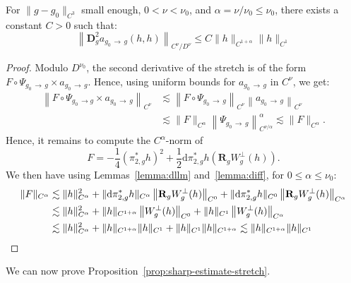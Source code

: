 \documentclass[AHL,Unicode,longabstracts,published]{cedram}
\newcommand{\RR}{\mathbf{R}}
\newcommand{\bdD}{\mathbf{D}}
\newcommand{\dd}{\mathrm{d}}
\begin{document}
\begin{lemm}\label{lemma:norme}
For $\| g-g_0\|_{C^3}$ small enough, $0<\nu < \nu_0$, and $\alpha = \nu/\nu_0 \leq \nu_0$, there exists a constant $C > 0$ such that:
\[
\left\|\bdD^2_g a_{g_0\,\to\,g} (h,h)\right\|_{C^{\nu}/D^\nu} \leq C \|h\|_{C^{1+\alpha}}\|h\|_{C^1}
\]
\end{lemm}


\begin{proof}
Modulo $D^{\nu_0}$, the second derivative of the stretch is of the form $F \circ \Psi_{g_0\,\to \,g} \times a_{g_0\,\to\,g}$. Hence, using uniform bounds for $a_{g_0\,\to\,g}$ in $C^{\nu}$, we get:
\begin{align*}
\left\|F \circ \Psi_{g_0\,\to g} \times a_{g_0 \,\to\,g}\right\|_{C^{\nu}} &\lesssim \left\|F \circ \Psi_{g_0\,\to\,g}\right\|_{C^{\nu}} \left\|a_{g_0\,\to\,g}\right\|_{C^{\nu}}\\
 &\lesssim \|F\|_{C^{\alpha}} \left\|\Psi_{g_0\,\to\,g}\right\|_{C^{\nu/\alpha}}^{\alpha} \lesssim \|F\|_{C^{\alpha}}.
\end{align*}
Hence, it remains to compute the $C^{\alpha}$-norm of
\[
F = -\frac{1}{4} \left(\pi_{2,g}^\ast h\right)^2 + \frac{1}{2} \dd \pi_{2,g}^\ast h\left(\RR_g W^\bot_g(h) \right).
\]
We then have using Lemmas~\ref{lemma:dllm} and~\ref{lemma:diff}, for $0\leq\alpha\leq \nu_0$:
\begin{align*}
\|F\|_{C^{\alpha}}& \lesssim \|h\|_{C^{\alpha}}^2 + \|\dd \pi_{2,g}^\ast h\|_{C^{\alpha}} \left\|\RR_g W^\bot_g(h)\right\|_{C^{0}} + \|\dd \pi_{2,g}^\ast h\|_{C^{0}} \left\|\RR_g W^\bot_g(h)\right\|_{C^{\alpha}} \\
& \lesssim \|h\|_{C^{\alpha}}^2 + \|h\|_{C^{1+\alpha}} \left\|W^\bot_g(h)\right\|_{C^{0}} + \|h\|_{C^1} \left\|W^\bot_g(h)\right\|_{C^{\alpha}} \\
& \lesssim \|h\|_{C^{\alpha}}^2 + \|h\|_{C^{1+\alpha}} \|h\|_{C^{1}} + \|h\|_{C^1} \|h\|_{C^{1+\alpha}} \lesssim \|h\|_{C^{1+\alpha}}\|h\|_{C^1}\qedhere
\end{align*}
\end{proof}

We can now prove Proposition~\ref{prop:sharp-estimate-stretch}.
\end{document}
